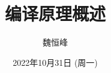 \documentclass[]{beamer}
\title[编译原理概述]{编译原理概述}
\author[魏恒峰]{\large 魏恒峰}
\institute{hfwei@nju.edu.cn}
\date{2022年10月31日 (周一)}
\begin{document}
\maketitle



\thankyou{}

\end{document}
